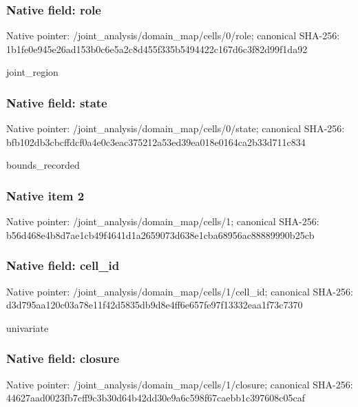 \documentclass[10pt,a4paper]{article}
\begin{document}
\subsubsection{Native field: role}
Native pointer: /joint\_\allowbreak{}analysis/domain\_\allowbreak{}map/cells/0/role; canonical SHA-256: 1b1fe0e945e26ad153b0c6e5a2c8d455f335b5494422c167d6c3f82d99f1da92

\begingroup\raggedright\sloppy joint\_\allowbreak{}region\par\endgroup

\subsubsection{Native field: state}
Native pointer: /joint\_\allowbreak{}analysis/domain\_\allowbreak{}map/cells/0/state; canonical SHA-256: bfb102db3cbcffdcf0a4e0c3eac375212a53ed39ea018e0164ca2b33d711c834

\begingroup\raggedright\sloppy bounds\_\allowbreak{}recorded\par\endgroup

\subsubsection{Native item 2}
Native pointer: /joint\_\allowbreak{}analysis/domain\_\allowbreak{}map/cells/1; canonical SHA-256: b56d468e4b8d7ae1cb49f4641d1a2659073d638e1cba68956ac88889990b25cb

\subsubsection{Native field: cell\_\allowbreak{}id}
Native pointer: /joint\_\allowbreak{}analysis/domain\_\allowbreak{}map/cells/1/cell\_\allowbreak{}id; canonical SHA-256: d3d795aa120c03a78e11f42d5835db9d8e4ff6e657fe97f13332eaa1f73c7370

\begingroup\raggedright\sloppy univariate\par\endgroup

\subsubsection{Native field: closure}
Native pointer: /joint\_\allowbreak{}analysis/domain\_\allowbreak{}map/cells/1/closure; canonical SHA-256: 44627aad0023fb7cff9c3b30d64b42dd30e9a6c598f67caebb1c397608c05caf
\end{document}
